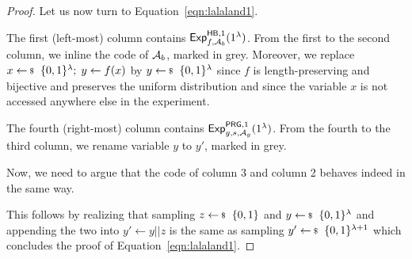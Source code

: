 \documentclass[a4paper,table,dvipsnames]{article}
\theoremstyle{definition}
\begin{document}
\begin{proof}
Let us now turn to Equation~\ref{eqn:lalaland1}.

\begin{center}
\begin{pchstack}
		\pchspace
		\pchspace
	  \pchspace
\end{pchstack}
\end{center}
The first (left-most) column contains ${\mathsf{Exp}}_{f,\mathcal{A}_b}^{\mathsf{HB},1}(1^\lambda)$.
From the first to the second column, we inline the code of $\mathcal{A}_b$, marked in grey.
Moreover, we replace $x\sample\bin^\lambda;\; y\gets f(x)$ by $y\sample\bin^\lambda$ since
$f$ is length-preserving and bijective and preserves the uniform distribution and since the
variable $x$ is not accessed anywhere else in the experiment.

The fourth (right-most) column contains ${\mathsf{Exp}}_{g,s,\mathcal{A}_g}^{\mathsf{PRG},1}(1^\lambda)$.
From the fourth to the third column, we rename variable $y$ to $y'$, marked in grey.

Now, we need to argue that the code of column 3 and column 2 behaves indeed in the same way.

This follows by realizing that sampling $z\sample\bin$ and $y\sample\bin^\lambda$ and appending
the two into $y'\gets y||z$ is the same as sampling $y'\sample\bin^{\lambda+1}$ which concludes 
the proof of Equation~\ref{eqn:lalaland1}.
\end{proof}
\end{document}
